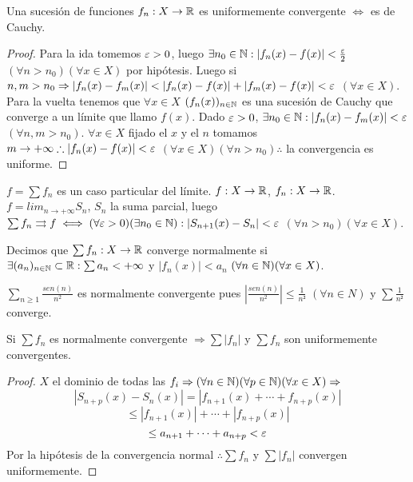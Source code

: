 \begin{theorem}
  Una sucesión de funciones $f_n : X \to \mathbb{R}$ es uniformemente convergente $\iff$ es de Cauchy.
  \begin{proof}
    Para la ida tomemos $\varepsilon > 0$, luego $\exists n_0 \in \mathbb{N} : |f_n(x) - f(x)| < \frac{\varepsilon}{2}$ $(\forall n > n_0)(\forall x \in X)$ por hipótesis. Luego si $n, m > n_0 \Rightarrow |f_n(x) - f_m(x)| < |f_n(x) - f(x)| + |f_m(x) - f(x)| < \varepsilon$ $(\forall x \in X)$. \\
    Para la vuelta tenemos que $\forall x \in X$ $(f_n(x))_{n \in \mathbb{N}}$ es una sucesión de Cauchy que converge a un límite que llamo $f(x)$. Dado $\varepsilon > 0$, $\exists n_0 \in \mathbb{N} : |f_n(x) - f_m(x)| < \varepsilon$ $(\forall n, m > n_0)$. $\forall x \in X$ fijado el $x$ y el $n$ tomamos $m \to +\infty \therefore |f_n(x) - f(x)| < \varepsilon$ $(\forall x \in X)(\forall n > n_0) \therefore$ la convergencia es uniforme. 
  \end{proof}
\end{theorem}

$f = \sum f_n$ es un caso particular del límite. $f : X \to \mathbb{R}$, $f_n: X \to \mathbb{R}$. $f = lim_{n \to +\infty} S_n$, $S_n$ la suma parcial, luego $\sum f_n \rightrightarrows f \iff (\forall \varepsilon > 0)(\exists n_0 \in \mathbb{N}) : |S_{n+1}(x) - S_n| < \varepsilon$ $(\forall n > n_0)(\forall x \in X)$.

\begin{definition}
  Decimos que $\sum f_n: X \to \mathbb{R}$ converge normalmente si $\exists (a_n)_{n \in \mathbb{N}} \subset \mathbb{R} : \sum a_n < +\infty$ y $ |f_n(x)| < a_n$ $(\forall n \in \mathbb{N})(\forall x \in X)$.
\end{definition}

\begin{eg}
  $\sum_{n \geq 1} \frac{sen(n)}{n^2}$ es normalmente convergente pues $|\frac{sen(n)}{n^2}| \leq \frac{1}{n²}$ $(\forall n \in N)$ y $\sum \frac{1}{n²}$ converge.
\end{eg}

\begin{theorem}
  Si $\sum f_n$ es normalmente convergente $\Rightarrow \sum |f_n|$ y $\sum f_n$ son uniformemente convergentes.
  \begin{proof}
    $X$ el dominio de todas las $f_i \Rightarrow (\forall n \in \mathbb{N})(\forall p \in \mathbb{N})(\forall x \in X) \Rightarrow$ \begin{equation}
      |S_{n + p}(x) - S_n(x)| = |f_{n+1}(x) + \cdots + f_{n + p}(x)|
    \end{equation}
    \begin{equation}
      \leq |f_{n+1}(x)| + \cdots + |f_{n+p}(x)|
    \end{equation}
    \begin{equation}
      \leq a_{n+1} + \cdots + a_{n+p} < \varepsilon
    \end{equation}
    Por la hipótesis de la convergencia normal $\therefore \sum f_n$ y $\sum |f_n|$ convergen uniformemente.
  \end{proof}
\end{theorem}

